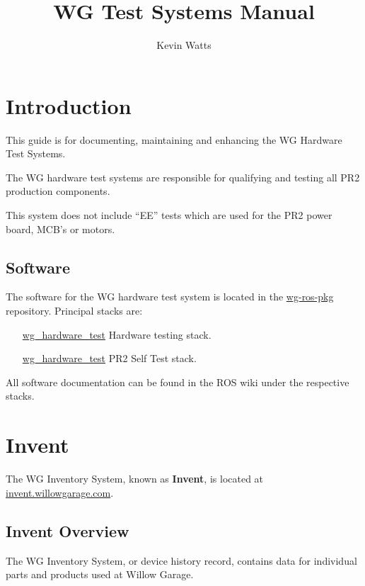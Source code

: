 \documentclass[11pt]{report}
\begin{document}
\title{WG Test Systems Manual}
\author{Kevin Watts}
\newcommand{\TODO}[1]{\textcolor{red}{TODO: #1}}
\maketitle

\tableofcontents
\newpage


\chapter {Introduction}

This guide is for documenting, maintaining and enhancing the WG Hardware Test Systems. 

The WG hardware test systems are responsible for qualifying and testing all PR2 production components.

This system does not include ``EE'' tests which are used for the PR2 power board, MCB's or motors.


\section {Software}

The software for the WG hardware test system is located in the \href{http://code.ros.org}{wg-ros-pkg} repository. Principal stacks are:
\begin{itemize}
\item [\href{http://www.ros.org/wiki/wg\_hardware\_test}{wg\_hardware\_test}] Hardware testing stack.
\item [\href{http://www.ros.org/wiki/wg\_hardware\_test}{wg\_hardware\_test}] PR2 Self Test stack.
\end{itemize}

All software documentation can be found in the ROS wiki under the respective stacks.

\chapter {Invent}

The WG Inventory System, known as {\bf Invent}, is located at \href{http://invent.willowgarage.com}{invent.willowgarage.com}. 

\section{Invent Overview}
The WG Inventory System, or device history record, contains data for individual parts and products used at Willow Garage. 
\end{document}
